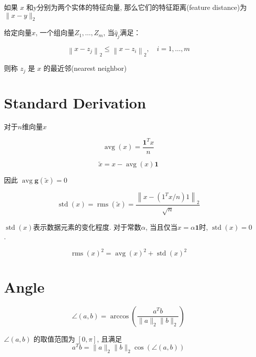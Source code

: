 \begin{definition}
    如果 $ x $ 和y分别为两个实体的特征向量, 那么它们的特征距离(feature distance)为 $ \|x-y\|_{2} $
\end{definition}

\begin{definition}
    给定向量$x$, 一个组向量$ Z_{1}, \ldots, Z_{m} $, 当$ \hat{q}_{j} $满足：

    $$ \left\|x-z_{j}\right\|_{2} \leq\left\|x-z_{i}\right\|_{2}, \quad i=1, \ldots, m $$

    则称 $ z_{j} $ 是 $ x $ 的最近邻(nearest neighbor)
\end{definition}

\section{Standard Derivation}

\begin{definition}[算术平均值]
    对于$n$维向量$x$

    $$ \operatorname{avg}(x)=\frac{\mathbf{1}^{T} x}{n} $$
\end{definition}

\begin{definition}
    $$ \tilde{x}=x-\operatorname{avg}(x) \mathbf{1} $$

    因此 $ \operatorname{avg} \boldsymbol{g}(\tilde{x})=0 $
\end{definition}

\begin{definition}[$x$的标准差]
    $$ \operatorname{std}(x)=\operatorname{rms}(\tilde{x})=\frac{\left\|x-\left(1^{T} x / n\right) 1\right\|_{2}}{\sqrt{n}} $$
\end{definition}

$\operatorname{std}(x)$表示数据元素的变化程度. 对于常数$\alpha$, 当且仅当$ x=\alpha \mathbf{1} $时, $ \operatorname{std}(x)=0 $.

\begin{theorem}
    $$ \operatorname{rms}(x)^{2}=\operatorname{avg}(x)^{2}+\operatorname{std}(x)^{2} $$
\end{theorem}

\section{Angle}

\begin{definition}
    $$ \angle(a, b)=\arccos \left(\frac{a^{T} b}{\|a\|_{2}\|b\|_{2}}\right) $$

    $ \angle(a, b) $ 的取值范围为 $ [0, \pi] $, 且满足$$ a^{T} b=\|a\|_{2}\|b\|_{2} \cos (\angle(a, b)) $$
\end{definition}

